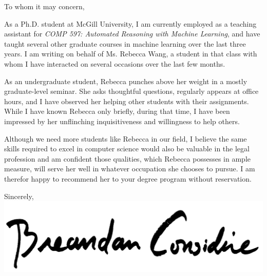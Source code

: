 \documentclass{letter}
\begin{document}
    \begin{letter}{}
        \opening{To whom it may concern,\\}
        As a Ph.D. student at McGill University, I am currently employed as a teaching assistant for \textit{COMP 597: Automated Reasoning with Machine Learning}, and have taught several other graduate courses in machine learning over the last three years. I am writing on behalf of Ms. Rebecca Wang, a student in that class with whom I have interacted on several occasions over the last few months.

        As an undergraduate student, Rebecca punches above her weight in a mostly graduate-level seminar. She asks thoughtful questions, regularly appears at office hours, and I have observed her helping other students with their assignments. While I have known Rebecca only briefly, during that time, I have been impressed by her unflinching inquisitiveness and willingness to help others.

        Although we need more students like Rebecca in our field, I believe the same skills required to excel in computer science would also be valuable in the legal profession and am confident those qualities, which Rebecca possesses in ample measure, will serve her well in whatever occupation she chooses to pursue. I am therefor happy to recommend her to your degree program without reservation.\\
        \closing{Sincerely,\\
            \includegraphics[scale=0.06]{signature}\\
        }
    \end{letter}
\end{document}
